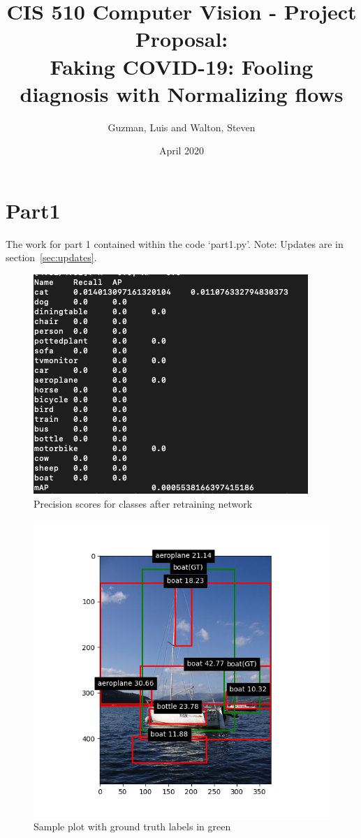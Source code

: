 \documentclass{article}
\title{CIS 510 Computer Vision - Project Proposal:\\
	Faking COVID-19: Fooling diagnosis with Normalizing flows}
\author{Guzman, Luis and Walton, Steven}
\date{April 2020}
\begin{document}
\maketitle

\section{Part1}
The work for part 1 contained within the code `part1.py'. 
Note: Updates are in section~\ref{sec:updates}.

\begin{figure}
\centering
\includegraphics[width=\textwidth]{mAP.png}
\caption{Precision scores for classes after retraining network}
\end{figure}

\begin{figure}
\centering
\includegraphics[width=\textwidth]{example.png}
\caption{Sample plot with ground truth labels in green}
\label{fig:boat}
\end{figure}
\end{document}
